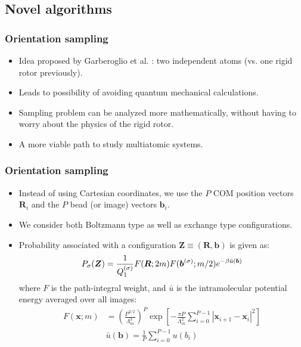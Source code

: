 \documentclass[xcolor=svgnames]{beamer}
\DeclareRobustCommand{\mbf}[1]{{\boldsymbol {#1}}}
\begin{document}
        \subsection{Novel algorithms}
        \begin{frame}
            \frametitle{Orientation sampling}
            \begin{itemize}
                \item Idea proposed by Garberoglio et al. : two independent atoms (vs. one rigid rotor previously).
                \item Leads to possibility of avoiding quantum mechanical calculations.
                \item Sampling problem can be analyzed more mathematically, without having to worry about the physics of the rigid rotor.
                \item A more viable path to study multiatomic systems.
            \end{itemize}
        \end{frame}
        \iffalse
        \begin{frame}
            \frametitle{Orientation sampling}
            \begin{itemize}
                \item Instead of using Cartesian coordinates, we use the $P$ COM position vectors $\mbf{R}_i$ and the $P$ bead (or image) vectors $\mbf{b}_i$.
                \item We consider both Boltzmann type as well as exchange type configurations.
                \item Probability associated with a configuration $\mbf{Z} \equiv (\mbf{R},\mbf{b})$ is given as:
                \begin{equation*}
                \label{eq:PIProb}
                    P_\sigma (\mbf{Z}) = \frac{1}{Q_1^{{\rm (\sigma)}}} F(\mbf{R};2m) F(\mbf{b}^{(\sigma)};m/2) e^{ - \beta \bar u(\mbf{b})}
                \end{equation*}
                where $F$ is the path-integral weight, and $\bar u$ is the intramolecular potential energy averaged over all images:
                \begin{equation*}
                    \begin{aligned}
                        F(\mbf{x};m) &= \left( \frac{P^{3/2}} {\Lambda _m^3} \right)^P \exp \left[ - \frac{\pi P}{\Lambda _m^2}\sum\limits_{i = 0}^{P-1} \left| \mbf{x}_{i + 1} - \mbf{x}_i \right|^2 \right]\\
                        &\bar u(\mbf{b}) = \frac{1}{P}\sum\limits_{i=0}^{P-1} {u\left(b_i \right)}
                    \end{aligned}
                \end{equation*}
            \end{itemize}
        \end{frame}
\end{document}
